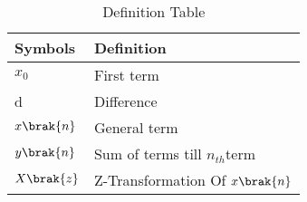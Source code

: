 \begin{table}[h]
\begin{tabular}{|l|l|}
\hline
\textbf{Symbols} & \textbf{Definition}\\ \hline
$x_0$ & First term\\ \hline
d & Difference\\ \hline
$x\brak{n}$ & General term \\ \hline
$y\brak{n}$ & Sum of terms till $n_{th}$term \\ \hline
$X\brak{z}$ & Z-Transformation Of $x\brak{n}$\\ \hline
\end{tabular}
\caption{Definition Table}
\label{tab:ncert 10_5_3_3}
\end{table}

